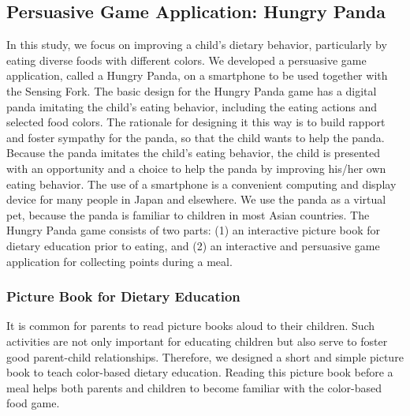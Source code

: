\subsection{Persuasive Game Application: Hungry Panda}
In this study, we focus on improving a child's dietary behavior, 
particularly by eating diverse foods with different colors. 
We developed a persuasive game application, 
called a Hungry Panda, on a smartphone to be used together with the Sensing Fork. 
The basic design for the Hungry Panda game has a digital panda imitating the child's eating behavior, 
including the eating actions and selected food colors. 
The rationale for designing it this way is to build rapport and foster sympathy for the panda, 
so that the child wants to help the panda. 
Because the panda imitates the child's eating behavior, 
the child is presented with an opportunity and a choice to help the panda 
by improving his/her own eating behavior. 
The use of a smartphone is a convenient computing and display device for many people in Japan 
and elsewhere. 
We use the panda as a virtual pet, because the panda is familiar to children 
in most Asian countries. 
The Hungry Panda game consists of two parts: 
(1) an interactive picture book for dietary education prior to eating, and 
(2) an interactive and persuasive game application for collecting points during a meal. 

\subsubsection{Picture Book for Dietary Education}
It is common for parents to read picture books aloud to their children. 
Such activities are not only important for educating children 
but also serve to foster good parent-child relationships. 
Therefore, we designed a short and simple picture book to teach color-based dietary education. 
Reading this picture book before a meal helps both parents and children to become familiar with the color-based food game. 

